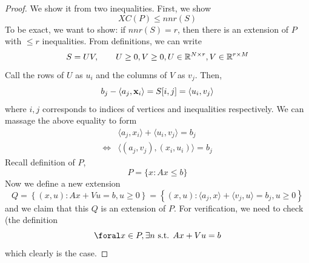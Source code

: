 \begin{proof}
	We show it from two inequalities. First, we show 
	\begin{equation}
		XC(P) \leq nnr(S)
	\end{equation}
	To be exact, we want to show: if $nnr(S) = r$, then there is an extension of $P$ with $\leq r$ inequalities. From definitions, we can write
	\begin{equation}
		S = UV, \quad \quad U\geq0, V \geq 0, U \in \mathbb{R}^{N \times r}, V \in \mathbb{R}^{r \times M}
	\end{equation}
	Call the rows of $U$ as $u_i$ and the columns of $V$ as $v_j$. Then, 
	\begin{equation}
		b_j - \langle a_j, \mathbf{x}_i \rangle = S[i, j] = \langle u_i, v_j \rangle
	\end{equation}
	where $i, j$ corresponds to indices of vertices and inequalities respectively. We can massage the above equality to form
	\begin{align}
		&\langle a_j, x_i \rangle + \langle u_i, v_j \rangle = b_j \\
		\iff &\langle (a_j, v_j), (x_i, u_i) \rangle = b_j 
	\end{align}
	Recall definition of $P$,
	\begin{equation}
		P = \{x: Ax \leq b \}
	\end{equation}	
	Now we define a new extension
	\begin{equation}
		Q = \left\{ (x, u) : Ax + Vu = b , u \geq 0 \right\} = \left\{ (x, u) : \langle a_j, x \rangle + \langle v_j , u \rangle = b_j , u \geq 0 \right\}
	\end{equation}
	and we claim that this $Q$ is an extension of $P$. For verification, we need to check (the definition
	\begin{equation}
		\foral x \in P, \exists n \text{ s.t. } Ax + Vu = b
	\end{equation}
	which clearly is the case. 
	
	
\end{proof}

 

























